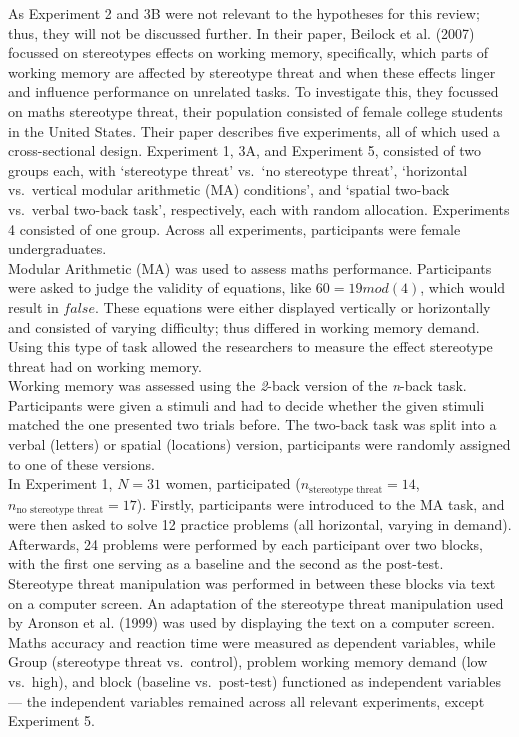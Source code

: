 \documentclass[
  stu,floatsintext]{apa7}
\begin{document}
As Experiment 2 and 3B were not relevant to the hypotheses for this review; thus, they will not be discussed further.
In their paper, Beilock et al. (2007) focussed on stereotypes effects on working memory, specifically, which parts of working memory are affected by stereotype threat and when these effects linger and influence performance on unrelated tasks.
To investigate this, they focussed on maths stereotype threat, their population consisted of female college students in the United States.
Their paper describes five experiments, all of which used a cross-sectional design.
Experiment 1, 3A, and Experiment 5, consisted of two groups each, with `stereotype threat' vs.~`no stereotype threat', `horizontal vs.~vertical modular arithmetic (MA) conditions', and `spatial two-back vs.~verbal two-back task', respectively, each with random allocation.
Experiments 4 consisted of one group.
Across all experiments, participants were female undergraduates.\\
Modular Arithmetic (MA) was used to assess maths performance.
Participants were asked to judge the validity of equations, like \(60 = 19 mod(4)\), which would result in \(false\).
These equations were either displayed vertically or horizontally and consisted of varying difficulty; thus differed in working memory demand.
Using this type of task allowed the researchers to measure the effect stereotype threat had on working memory.\\
Working memory was assessed using the \emph{2}-back version of the \emph{n}-back task.
Participants were given a stimuli and had to decide whether the given stimuli matched the one presented two trials before.
The two-back task was split into a verbal (letters) or spatial (locations) version, participants were randomly assigned to one of these versions.\\
In Experiment 1, \(N = 31\) women, participated (\(n_{\text{stereotype threat}} = 14\), \(n_{\text{no stereotype threat}} = 17\)).
Firstly, participants were introduced to the MA task, and were then asked to solve 12 practice problems (all horizontal, varying in demand).
Afterwards, 24 problems were performed by each participant over two blocks, with the first one serving as a baseline and the second as the post-test.
Stereotype threat manipulation was performed in between these blocks via text on a computer screen.
An adaptation of the stereotype threat manipulation used by Aronson et al. (1999) was used by displaying the text on a computer screen.
Maths accuracy and reaction time were measured as dependent variables, while Group (stereotype threat vs.~control), problem working memory demand (low vs.~high), and block (baseline vs.~post-test) functioned as independent variables --- the independent variables remained across all relevant experiments, except Experiment 5.\\
\end{document}
